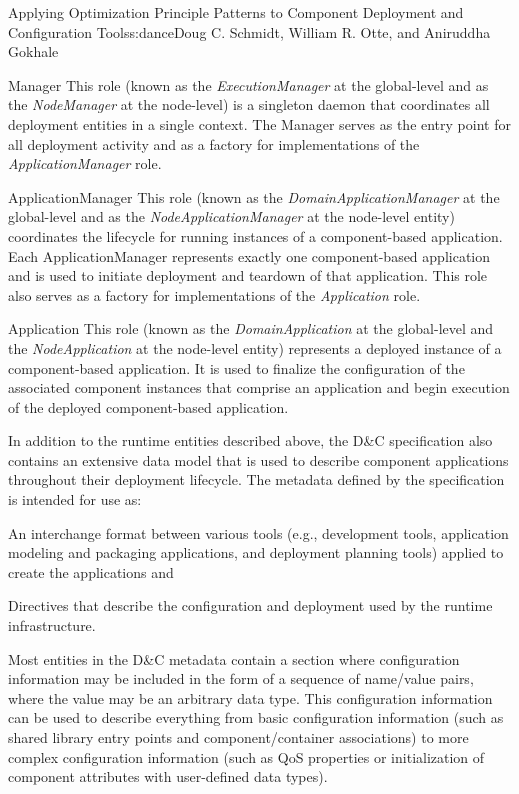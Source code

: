 \begin{aosachapter}{Applying Optimization Principle Patterns to Component Deployment and
                    Configuration Tools}{s:dance}{Doug C. Schmidt, William R. Otte, and Aniruddha Gokhale}
\begin{aosadescription}
\item[Manager]
This role (known as the \emph{ExecutionManager} at the global-level and
as the \emph{NodeManager} at the node-level) is a singleton daemon that
coordinates all deployment entities in a single context. The Manager
serves as the entry point for all deployment activity and as a factory
for implementations of the \emph{ApplicationManager} role.
\item[ApplicationManager]
This role (known as the \emph{DomainApplicationManager} at the
global-level and as the \emph{NodeApplicationManager} at the node-level
entity) coordinates the lifecycle for running instances of a
component-based application. Each ApplicationManager represents exactly
one component-based application and is used to initiate deployment and
teardown of that application. This role also serves as a factory for
implementations of the \emph{Application} role.
\item[Application]
This role (known as the \emph{DomainApplication} at the global-level and
the \emph{NodeApplication} at the node-level entity) represents a
deployed instance of a component-based application. It is used to
finalize the configuration of the associated component instances that
comprise an application and begin execution of the deployed
component-based application.
\end{aosadescription}


\label{sec.overview.model}

In addition to the runtime entities described above, the D\&C
specification also contains an extensive data model that is used to
describe component applications throughout their deployment lifecycle.
The metadata defined by the specification is intended for use as:

\begin{aosaitemize}
\item
  An interchange format between various tools (e.g., development tools,
  application modeling and packaging applications, and deployment
  planning tools) applied to create the applications and
\item
  Directives that describe the configuration and deployment used by the
  runtime infrastructure.
\end{aosaitemize}

Most entities in the D\&C metadata contain a section where configuration
information may be included in the form of a sequence of name/value
pairs, where the value may be an arbitrary data type. This configuration
information can be used to describe everything from basic configuration
information (such as shared library entry points and component/container
associations) to more complex configuration information (such as QoS
properties or initialization of component attributes with user-defined
data types).


\end{aosachapter}
